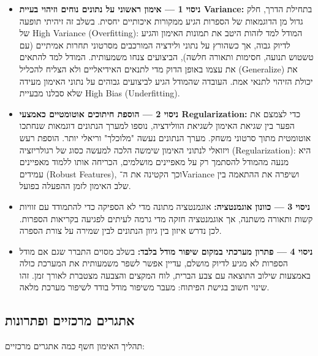 \begin{itemize}
\item \textbf{ניסוי 1 --- אימון ראשוני על נתונים נוחים וזיהוי בעיית
    \textenglish{Variance}:} בתחילת הדרך, חלק גדול מן הדוגמאות של
  הספרות הגיע ממקורות איכותיים יחסית. בשלב זה זיהיתי תופעה של
  \textenglish{High \newline Variance (Overfitting)}: המודל למד לזהות
  היטב את תמונות האימון והגיע לדיוק גבוה, אך כשהורץ על נתוני ולידציה
  המורכבים מסרטוני תחרות אמיתיים (עם טשטוש תנועה, חסימות ותאורה חלשה),
  הביצועים צנחו משמעותית. המודל למד להתאים את עצמו באופן הדוק מדי
  לתנאים האידיאליים ולא הצליח להכליל (\textenglish{Generalize}) את
  יכולת הזיהוי לתנאי אמת. העובדה שהמודל הגיע לביצועים גבוהים על נתוני
  האימון מעידה שלא סבלנו מבעיית \textenglish{High Bias
    (Underfitting)}.

\item \textbf{ניסוי 2 --- הוספת חיתוכים אוטומטיים כאמצעי
    \textenglish{Regularization}:} כדי לצמצם את הפער בין שגיאת האימון
  לשגיאת הוולידציה, נוספו למערך הנתונים דוגמאות שנחתכו אוטומטית מתוך
  סרטוני משחק. מערך הנתונים נעשה "מלוכלך" וריאלי יותר. הוספת רעש
  ויזואלי לנתוני האימון שימשה הלכה למעשה כסוג של רגולריזציה
  (\textenglish{Regularization}): היא מנעה מהמודל להסתמך רק על
  מאפיינים מושלמים, הכריחה אותו ללמוד מאפיינים עמידים
  (\textenglish{Robust Features}), וכך הקטינה את
  ה־\textenglish{Variance} ושיפרה את ההתאמה בין שלב האימון לזמן ההפעלה
  בפועל.
\item \textbf{ניסוי 3 --- כוונון אוגמנטציה:} אוגמנטציה מתונה מדי לא
  הספיקה כדי להתמודד עם זוויות קשות ותאורה משתנה, אך אוגמנטציה חזקה מדי
  גרמה לעיתים לפגיעה בקריאות הספרות. לכן נדרש איזון בין גיוון הנתונים
  לבין שמירה על צורת הספרה.
\item \textbf{ניסוי 4 --- פתרון מערכתי במקום שיפור מודל בלבד:} בשלב
  מסוים התברר שגם אם מודל הספרות לא מגיע לדיוק מושלם, עדיין אפשר לשפר
  משמעותית את המערכת כולה באמצעות שילוב התוצאה עם צבע הברית, לוח המקצים
  והצבעה מצטברת לאורך זמן. זהו שינוי חשוב בגישת הפיתוח: מעבר משיפור
  מודל בודד לשיפור מערכת מלאה.
\end{itemize}

\subsection{אתגרים מרכזיים ופתרונות}

תהליך האימון חשף כמה אתגרים מרכזיים:

